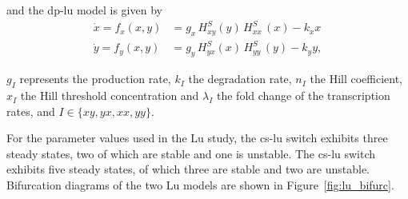 \noindent and the \acrshort{dp-lu} model is given by
\begin{align}
\dot{x} = f_{x}(x,y) &= g_{x}\, H^{S}_{xy}(y)\, H^{S}_{xx}\,(x)-k_{x}x \\
\dot{y} = f_{y}(x,y) &= g_{y}\,H^{S}_{yx}(x)\,H^{S}_{yy}\,(y)-k_{y}y,
\end{align}

\noindent $g_I$ represents the production rate, $k_I$ the degradation rate, $n_I$ the Hill coefficient, $x_I$ the Hill threshold concentration and $\lambda_I$ the fold change of the transcription rates, and $I\in\{xy, yx, xx, yy\}$.

For the parameter values used in the Lu study, the \acrshort{cs-lu} switch exhibits three steady states, two of which are stable and one is unstable. The \acrshort{cs-lu} switch exhibits five steady states, of which three are stable and two are unstable. Bifurcation diagrams of the two Lu models are shown in Figure~\ref{fig:lu_bifurc}. 


